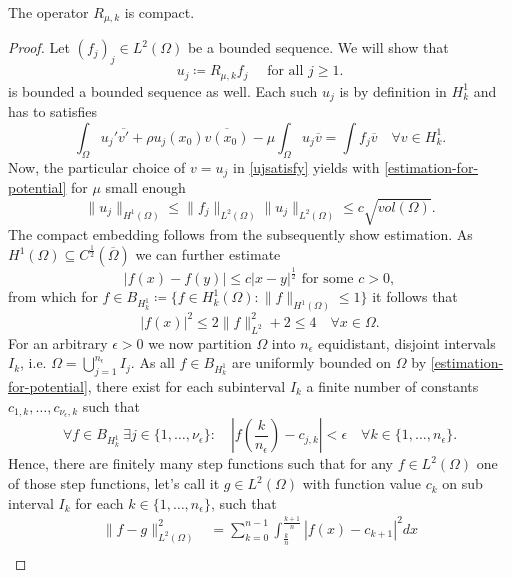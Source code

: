 \begin{theorem} \label{3.1:thm-Rmuk.isCompact}
	The operator $R_{\mu, k}$ is compact.

	\begin{proof}
	Let $(f_{j})_{j} \in L^{2}(\Omega)$ be a  bounded sequence. We will show that 
		\[ u_{j} \coloneqq R_{\mu, k} f_{j} \quad \text{ for all } j \geq 1. \]
	is bounded a bounded sequence as well. Each such $u_{j}$ is by definition in $H^{1}_{k}$ and has to satisfies 
		\begin{equation}
			\int_{\Omega} u_{j}' \overline{v'} + \rho u_{j}(x_{0}) \overline{v(x_{0})} - \mu \int_{\Omega} u_{j} \overline{v} = \int f_{j} \overline{v} \quad \forall v \in H^{1}_{k}. \label{ujsatisfy}
		\end{equation} 
	Now, the particular choice of $v = u_{j}$ in \eqref{ujsatisfy} yields with \eqref{estimation-for-potential} for $\mu$ small enough
		\[  \| u_{j} \|_{H^{1}(\Omega)} \leq \| f_{j} \|_{L^{2}(\Omega)} \| u_{j} \|_{L^{2}(\Omega)} \leq c \sqrt{vol(\Omega)}. \]
	The compact embedding follows from the subsequently show estimation. As $H^1(\Omega) \subseteq C^{\frac{1}{2}}(\overline{\Omega})$ we can further estimate 
		\begin{equation}
			|f(x) - f(y)| \leq c |x - y|^{\frac{1}{2}} \text{ for some } c > 0, \label{eq:H1estimation}
		\end{equation}
	from which for $f \in B_{H^{1}_{k}} \coloneqq \{ f \in H^{1}_{k}(\Omega) : \| f \|_{H^{1}(\Omega)} \leq 1 \}$ it follows that 
		\[ |f(x)|^{2} \leq 2 \| f \|_{L^{2}}^{2} + 2 \leq 4 \quad \forall x \in \Omega. \]
	For an arbitrary $\epsilon > 0$ we now partition $\Omega$ into $n_{\epsilon}$ equidistant, disjoint intervals $I_{k}$, i.e. $\Omega = \bigcup_{j = 1}^{n_{\epsilon}} I_{j}$. As all $f \in B_{H^{1}_{k}}$ are uniformly bounded on $\Omega$ by \eqref{estimation-for-potential}, there exist for each subinterval $I_{k}$ a finite number of constants $c_{1, k}, \dotsc, c_{\nu_{\epsilon}, k}$ such that 
			$$ \forall f \in B_{H^{1}_{k}} ~\exists j \in \{1, \dotsc, \nu_{\epsilon} \}: \quad \left|f\left(\frac{k}{n_{\epsilon}}\right) - c_{j, k}\right| < \epsilon \quad \forall k \in \{ 1 , \dotsc, n_{\epsilon} \}. $$	
	Hence, there are finitely many step functions such that for any $f \in L^{2}(\Omega)$ one of those step functions, let's call it $g \in L^{2}(\Omega)$ with function value $c_{k}$ on sub interval $I_{k}$ for each $k \in \{ 1, \dotsc, n_{\epsilon} \}$, such that
		\begin{align*}
			\| f - g \|^{2}_{L^{2}(\Omega)} & = \sum_{k = 0}^{n-1} \int_{\frac{k}{n}}^{\frac{k+1}{n}} | f(x) - c_{k+1} |^{2} dx \\

\end{align*}
\end{proof}
\end{theorem}
